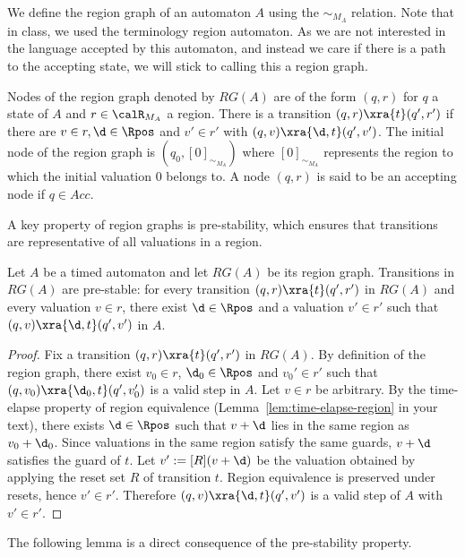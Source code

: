 We define the region graph of an automaton $A$ using the $\sim_{M_A}$ relation. Note that in class, we used the terminology region automaton. As we are not interested in the language accepted by this automaton, and instead we care if there is a path to the accepting state, we will stick to calling this a region graph.

\begin{definition}
Nodes of the region graph denoted by $RG(A)$ are of the form $(q, r)$ for $q$ a state of $A$ and $r \in \calR_{M_A}$ a region. There is a transition $(q, r) \xra{t} (q', r')$ if there are $v \in r, \d \in \Rpos$ and $v' \in r'$ with $(q, v) \xra{\d, t} (q', v')$. The initial node of the region graph is $(q_0, [0]_{\sim_{M_A}})$ where $[0]_{\sim_{M_A}}$ represents the region to which the initial valuation $0$ belongs to. A node $(q, r)$ is said to be an accepting node if $q \in Acc$.
\end{definition}

A key property of region graphs is pre-stability, which ensures that transitions are representative of all valuations in a region.

\begin{lemma}
\label{lem:prestability}
Let $A$ be a timed automaton and let $RG(A)$ be its region graph. Transitions in $RG(A)$ are pre-stable: for every transition $(q,r)\xra{t}(q',r')$ in $RG(A)$ and every valuation $v \in r$, there exist $\d \in \Rpos$ and a valuation $v' \in r'$ such that $(q,v)\xra{\d,t}(q',v')$ in $A$.
\end{lemma}

\begin{proof}
Fix a transition $(q,r)\xra{t}(q',r')$ in $RG(A)$. By definition of the region graph, there exist $v_0 \in r$, $\d_0 \in \Rpos$ and $v_0' \in r'$ such that $(q,v_0)\xra{\d_0,t}(q',v_0')$ is a valid step in $A$. Let $v \in r$ be arbitrary. By the time-elapse property of region equivalence (Lemma~\ref{lem:time-elapse-region} in your text), there exists $\d \in \Rpos$ such that $v+\d$ lies in the same region as $v_0+\d_0$. Since valuations in the same region satisfy the same guards, $v+\d$ satisfies the guard of $t$. Let $v' := [R](v+\d)$ be the valuation obtained by applying the reset set $R$ of transition $t$. Region equivalence is preserved under resets, hence $v' \in r'$. Therefore $(q,v)\xra{\d,t}(q',v')$ is a valid step of $A$ with $v' \in r'$. 
\end{proof}

The following lemma is a direct consequence of the pre-stability property.

